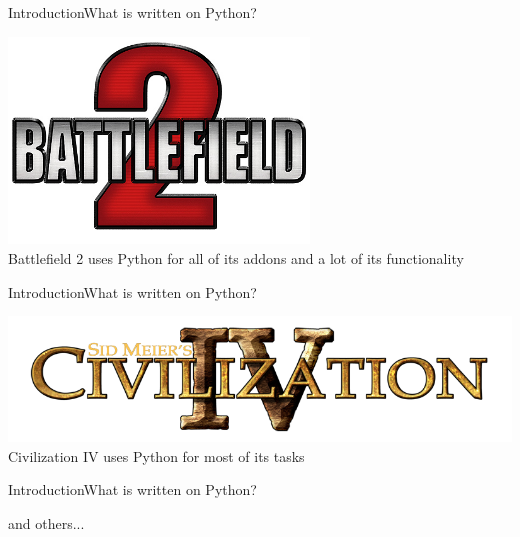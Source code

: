 \documentclass[10pt]{beamer}
\begin{document}
\begin{frame}{Introduction}{What is written on Python?}
	\begin{center}
		\includegraphics[width=0.6\textwidth]{pictures/batl2.jpg}
		\large{\\Battlefield 2 uses Python for all of its addons and a lot of its functionality}
	\end{center}
\end{frame}



\begin{frame}{Introduction}{What is written on Python?}
	\begin{center}
		\includegraphics[width=1\textwidth]{pictures/civilization.png}
		\large{\\Civilization IV uses Python for most of its tasks}
	\end{center}
\end{frame}

\begin{frame}{Introduction}{What is written on Python?}
	\begin{center}
		\Huge and others...
	\end{center}
\end{frame}
\end{document}
